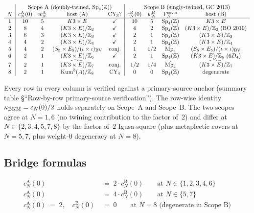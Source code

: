 \[
\begin{array}{c|cccc|cccc}
   & \multicolumn{4}{c|}{\text{Scope~A (doubly-twined, $\SpFour$)}}
   & \multicolumn{4}{c}{\text{Scope~B (singly-twined, GC 2013)}} \\
 N & c_N^{\mathrm A}(0) & w_N^{\mathrm A} & \text{host (A)} & \text{CY\textsubscript{3}?}
   & c_N^{\mathrm B}(0) & w_N^{\mathrm B} & \Gamma_N^{\mathrm{cover}} & \text{host (B)} \\ \hline
 1 & 10 & 5 & K3 \times E & \checkmark
   & 10 & 5 & \SpFour & K3 \times E \\
 2 & 8 & 4 & (K3 \times E)/\mathbb Z_2 & \checkmark
   & 4 & 2 & \SpFour & (K3 \times E)/\mathbb Z_2\ (\text{BO 2019}) \\
 3 & 6 & 3 & (K3 \times E)/\mathbb Z_3 & \checkmark
   & 2 & 1 & \SpFour & (K3 \times E)/\mathbb Z_3 \\
 4 & 4 & 2 & (K3 \times E)/\mathbb Z_4 & \checkmark
   & 2 & 1 & \SpFour & (K3 \times E)/\mathbb Z_4 \\
 5 & 4 & 2 & (S_5 \times E_5)/(\iota\times\iota)_\text{BV} & \text{conj.}
   & 1 & 1/2 & \MpFour & (S_5 \times E_5)/(\iota\times\iota)_\text{BV} \\
 6 & 2 & 1 & (K3 \times E)/\mathbb Z_6 & \checkmark
   & 2 & 1 & \SpFour & (K3 \times E)/\mathbb Z_6\ (6 D_4) \\
 7 & 2 & 1 & \widetilde{(K3 \times E)/\mathbb Z_7} & \text{conj.}
   & 1/2 & 1/4 & \MpFourTilde & \widetilde{(K3 \times E)/\mathbb Z_7} \\
 8 & 2 & 1 & \mathrm{Kum}^3(A)/\mathbb Z_8 & \text{CY\textsubscript{4}}
   & 0 & 0 & \SpFour & \text{degenerate} \\
\end{array}
\]

Every row in every column is verified against a primary-source anchor
(summary table \S``Row-by-row primary-source verification''). The row-wise
identity $\kappa_{\mathrm{BKM}} = c_N(0)/2$ holds separately on Scope~A and Scope~B.
The two scopes agree at $N = 1, 6$ (no twining contribution to the
factor of~$2$) and differ at $N \in \{2, 3, 4, 5, 7, 8\}$ by the
factor of~$2$ Igusa-square (plus metaplectic covers at $N = 5, 7$,
plus weight-$0$ degeneracy at $N = 8$).

\subsection*{Bridge formulas}

\begin{align*}
 c_N^{\mathrm A}(0) &\;=\; 2 \cdot c_N^{\mathrm B}(0) \qquad
   \text{at $N \in \{1, 2, 3, 4, 6\}$} \\
 c_N^{\mathrm A}(0) &\;=\; 4 \cdot c_N^{\mathrm B}(0) \qquad
   \text{at $N \in \{5, 7\}$} \\
 c_N^{\mathrm A}(0) \;=\; 2, \quad c_N^{\mathrm B}(0) &\;=\; 0 \qquad
   \text{at $N = 8$ (degenerate in Scope~B)}
\end{align*}

